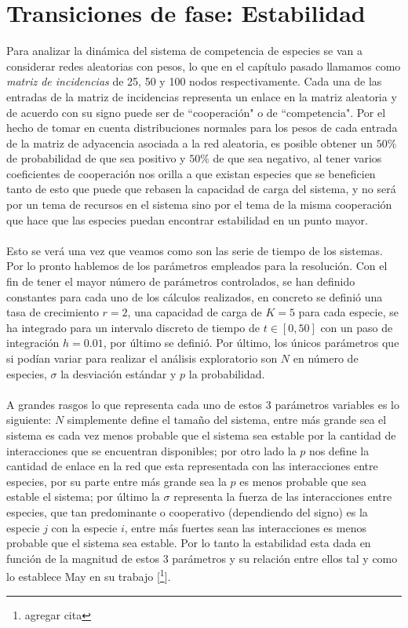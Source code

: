 \chapter{Transiciones de fase: Estabilidad}

Para analizar la dinámica del sistema de competencia de especies se van a considerar redes aleatorias con pesos, lo que en el capítulo pasado llamamos como \textit{matriz de incidencias} de 25, 50 y 100 nodos respectivamente. Cada una de las entradas de la matriz de incidencias representa un enlace en la matriz aleatoria y de acuerdo con su signo puede ser de ``cooperación" o de ``competencia". Por el hecho de tomar en cuenta distribuciones normales para los pesos de cada entrada de la matriz de adyacencia asociada a la red aleatoria, es posible obtener un $50\%$ de probabilidad de que sea positivo y $50\%$ de que sea negativo, al tener varios coeficientes de cooperación nos orilla a que existan especies que se beneficien tanto de esto que puede que rebasen la capacidad de carga del sistema, y no será por un tema de recursos en el sistema sino por el tema de la misma cooperación que hace que las especies puedan encontrar estabilidad en un punto mayor.
\\
\\
Esto se verá una vez que veamos como son las serie de tiempo de los sistemas. Por lo pronto hablemos de los parámetros empleados para la resolución. Con el fin de tener el mayor número de parámetros controlados, se han definido constantes para cada uno de los cálculos realizados, en concreto se definió una tasa de crecimiento $r=2$, una capacidad de carga de $K=5$ para cada especie, se ha integrado para un intervalo discreto de tiempo de $t\in[0,50]$ con un paso de integración $h=0.01$, por último se definió. Por último, los únicos parámetros que si podían variar para realizar el análisis exploratorio son $N$ en número de especies, $\sigma$ la desviación estándar y $p$ la probabilidad.\\
\\
A grandes rasgos lo que representa cada uno de estos 3 parámetros variables es lo siguiente: $N$ simplemente define el tamaño del sistema, entre más grande sea el sistema es cada vez menos probable que el sistema sea estable por la cantidad de interacciones que se encuentran disponibles; por otro lado la $p$ nos define la cantidad de enlace en la red que esta representada con las interacciones entre especies, por su parte entre más grande sea la $p$ es menos probable que sea estable el sistema; por último la $\sigma$ representa la fuerza de las interacciones entre especies, que tan predominante o cooperativo (dependiendo del signo) es la especie $j$ con la especie $i$, entre más fuertes sean las interacciones es menos probable que el sistema sea estable. Por lo tanto la estabilidad esta dada en función de la magnitud de estos 3 parámetros y su relación entre ellos tal y como lo establece May en su trabajo [\footnote{agregar cita}].\\
